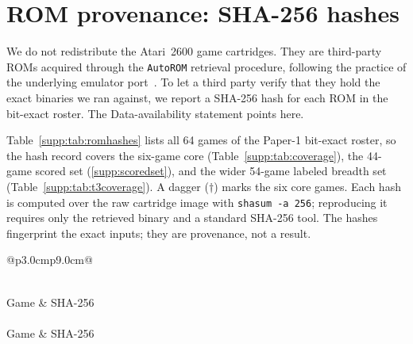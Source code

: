\section{ROM provenance: SHA-256 hashes}\label{supp:romhashes}

We do not redistribute the Atari~2600 game cartridges. They are third-party ROMs
acquired through the \texttt{AutoROM} retrieval procedure, following the practice of the
underlying emulator port~\cite{maier2025vcs}. To let a third party verify that they hold the
exact binaries we ran against, we report a SHA-256 hash for each ROM in the bit-exact
roster. The Data-availability statement points here.

Table~\ref{supp:tab:romhashes} lists all 64 games of the Paper-1 bit-exact roster, so the
hash record covers the six-game core (Table~\ref{supp:tab:coverage}), the 44-game scored set
(\Sectionname\ref{supp:scoredset}), and the wider 54-game labeled breadth set
(Table~\ref{supp:tab:t3coverage}). A dagger ($\dagger$) marks the six core games. Each hash is computed over the raw cartridge image
with \texttt{shasum -a 256}; reproducing it requires only the retrieved binary and a standard
SHA-256 tool. The hashes fingerprint the exact inputs; they are provenance, not a result.

\makeatletter
\def\hash#1{{\ttfamily\footnotesize\@hashaux#1\relax}}
\def\@hashaux#1{\ifx\relax#1\else#1\discretionary{}{}{}\expandafter\@hashaux\fi}
\makeatother

\begin{longtable}{@{}p{3.0cm}p{9.0cm}@{}}
\caption{\textbf{SHA-256 hashes of the 64 bit-exact ROMs.} One row per game of the
Paper-1 roster. A dagger ($\dagger$) marks the six core games; the 44 games of the scored set
(\Sectionname\ref{supp:scoredset}) carry interpretability scores, and the remaining rows
document the wider substrate whose ROM binaries are pinned but not scored. Hashes are
computed with \texttt{shasum -a 256} over the retrieved cartridge image and are a provenance
record only.}
\label{supp:tab:romhashes} \\
\toprule
Game & SHA-256 \\
\midrule
\endfirsthead
{}\\
\toprule
Game & SHA-256 \\
\midrule
\endhead
\bottomrule
\endfoot

\end{longtable}
